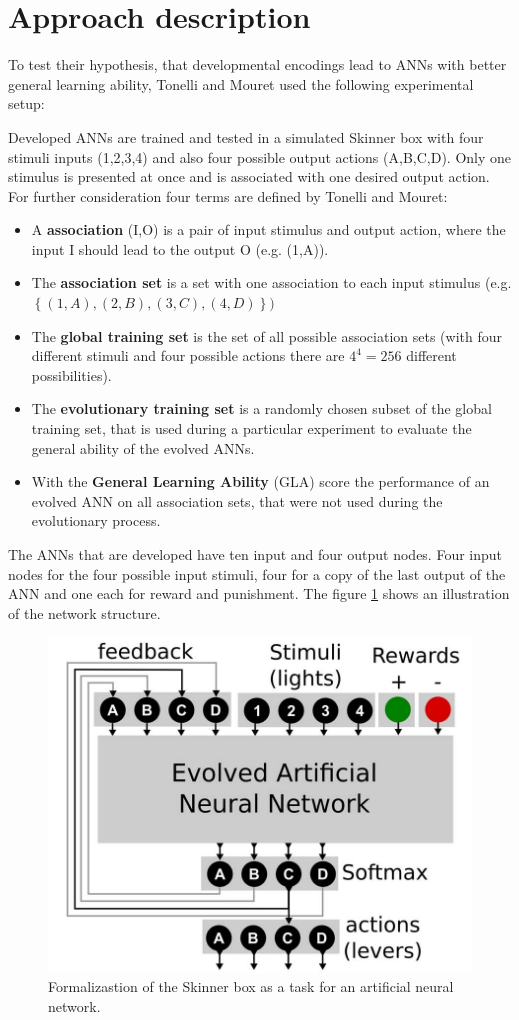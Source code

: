 \documentclass[12pt,twoside]{article}
\theoremstyle{plain}
\theoremstyle{definition}
\theoremstyle{remark}
\begin{document}
\section{Approach description}
\label{sec:model}
To test their hypothesis, that developmental encodings lead to ANNs with better general learning ability, Tonelli and Mouret used the following experimental setup:\medskip

Developed ANNs are trained and tested in a simulated Skinner box with four stimuli inputs (1,2,3,4) and also four possible output actions (A,B,C,D). Only one stimulus is presented at once and is associated with one desired output action.
For further consideration four terms are defined by Tonelli and Mouret:
\begin{itemize}
	\item A \textbf{association} (I,O) is a pair of input stimulus and output action, where the input I should lead to the output O (e.g. (1,A)).
	\item The \textbf{association set} is a set with one association to each input stimulus (e.g. $\left\{(1,A),(2,B),(3,C),(4,D)\right\})$
	\item The \textbf{global training set} is the set of all possible association sets (with four different stimuli and four possible actions there are $4^4 = 256$ different possibilities).
	\item The \textbf{evolutionary training set} is a randomly chosen subset of the global training set, that is used during a particular experiment to evaluate the general  ability of the evolved ANNs.
	\item With the \textbf{General Learning Ability} (GLA) score the performance of an evolved ANN on all association sets, that were not used during the evolutionary process.
\end{itemize}

The ANNs that are developed have ten input and four output nodes. Four input nodes for the four possible input stimuli, four for a copy of the last output of the ANN and one each for reward and punishment.
The figure \ref{fig:formalization} shows an illustration of the network structure.

\begin{figure}[h]
	\begin{center}
		\includegraphics[width=.4\textwidth]{network_structure.png}
	\end{center}
	\caption{Formalizastion of the Skinner box as a task for an artificial neural network.}
	\label{fig:formalization}
\end{figure}
\end{document}
